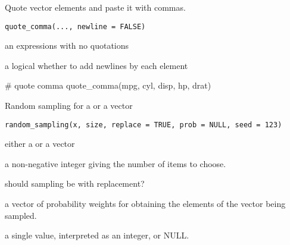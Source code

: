 \documentclass[letterpaper]{book}
\begin{document}
%
\begin{Description}
Quote vector elements and paste it with commas.
\end{Description}
%
\begin{Usage}
\begin{verbatim}
quote_comma(..., newline = FALSE)
\end{verbatim}
\end{Usage}
%
\begin{Arguments}
\begin{ldescription}
\item[\code{...}] an expressions with no quotations

\item[\code{newline}] a logical whether to add newlines by each element
\end{ldescription}
\end{Arguments}
%
\begin{Examples}
\begin{ExampleCode}
# quote comma
quote_comma(mpg, cyl, disp, hp, drat)

\end{ExampleCode}
\end{Examples}
%
\begin{Description}
Random sampling for a  or a vector
\end{Description}
%
\begin{Usage}
\begin{verbatim}
random_sampling(x, size, replace = TRUE, prob = NULL, seed = 123)
\end{verbatim}
\end{Usage}
%
\begin{Arguments}
\begin{ldescription}
\item[\code{x}] either a  or a vector

\item[\code{size}] a non-negative integer giving the number of items to choose.

\item[\code{replace}] should sampling be with replacement?

\item[\code{prob}] a vector of probability weights for obtaining the elements of the vector being sampled.

\item[\code{seed}] a single value, interpreted as an integer, or NULL.
\end{ldescription}
\end{Arguments}
\end{document}
